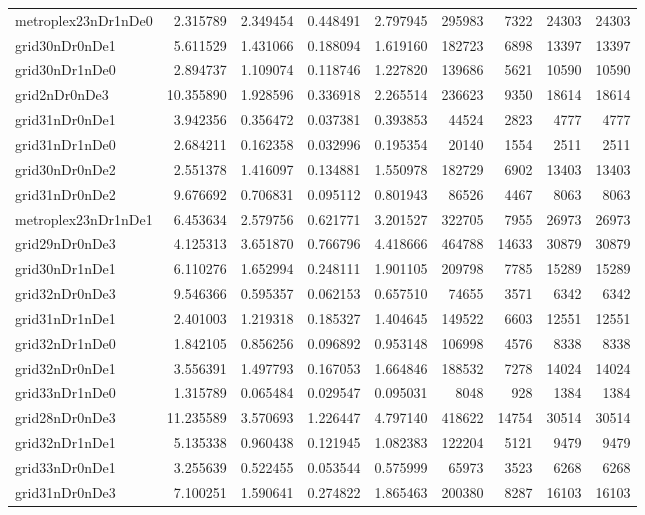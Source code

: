 \documentclass[../../../thesis.tex]{subfiles}
\begin{document}
\begin{longtable}{|l|r|r|r|r|r|r|r|r|}
metroplex23nDr1nDe0 & 2.315789 & 2.349454 & 0.448491 & 2.797945 & 295983 & 7322 & 24303 & 24303 \\
grid30nDr0nDe1 & 5.611529 & 1.431066 & 0.188094 & 1.619160 & 182723 & 6898 & 13397 & 13397 \\
grid30nDr1nDe0 & 2.894737 & 1.109074 & 0.118746 & 1.227820 & 139686 & 5621 & 10590 & 10590 \\
grid2nDr0nDe3 & 10.355890 & 1.928596 & 0.336918 & 2.265514 & 236623 & 9350 & 18614 & 18614 \\
grid31nDr0nDe1 & 3.942356 & 0.356472 & 0.037381 & 0.393853 & 44524 & 2823 & 4777 & 4777 \\
grid31nDr1nDe0 & 2.684211 & 0.162358 & 0.032996 & 0.195354 & 20140 & 1554 & 2511 & 2511 \\
grid30nDr0nDe2 & 2.551378 & 1.416097 & 0.134881 & 1.550978 & 182729 & 6902 & 13403 & 13403 \\
grid31nDr0nDe2 & 9.676692 & 0.706831 & 0.095112 & 0.801943 & 86526 & 4467 & 8063 & 8063 \\
metroplex23nDr1nDe1 & 6.453634 & 2.579756 & 0.621771 & 3.201527 & 322705 & 7955 & 26973 & 26973 \\
grid29nDr0nDe3 & 4.125313 & 3.651870 & 0.766796 & 4.418666 & 464788 & 14633 & 30879 & 30879 \\
grid30nDr1nDe1 & 6.110276 & 1.652994 & 0.248111 & 1.901105 & 209798 & 7785 & 15289 & 15289 \\
grid32nDr0nDe3 & 9.546366 & 0.595357 & 0.062153 & 0.657510 & 74655 & 3571 & 6342 & 6342 \\
grid31nDr1nDe1 & 2.401003 & 1.219318 & 0.185327 & 1.404645 & 149522 & 6603 & 12551 & 12551 \\
grid32nDr1nDe0 & 1.842105 & 0.856256 & 0.096892 & 0.953148 & 106998 & 4576 & 8338 & 8338 \\
grid32nDr0nDe1 & 3.556391 & 1.497793 & 0.167053 & 1.664846 & 188532 & 7278 & 14024 & 14024 \\
grid33nDr1nDe0 & 1.315789 & 0.065484 & 0.029547 & 0.095031 & 8048 & 928 & 1384 & 1384 \\
grid28nDr0nDe3 & 11.235589 & 3.570693 & 1.226447 & 4.797140 & 418622 & 14754 & 30514 & 30514 \\
grid32nDr1nDe1 & 5.135338 & 0.960438 & 0.121945 & 1.082383 & 122204 & 5121 & 9479 & 9479 \\
grid33nDr0nDe1 & 3.255639 & 0.522455 & 0.053544 & 0.575999 & 65973 & 3523 & 6268 & 6268 \\
grid31nDr0nDe3 & 7.100251 & 1.590641 & 0.274822 & 1.865463 & 200380 & 8287 & 16103 & 16103 \\

\end{longtable}
\end{document}
